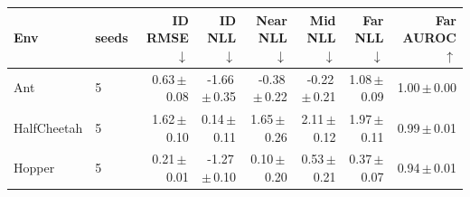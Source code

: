 \begin{tabular}{llrrrrrr}
\toprule
Env & seeds & ID RMSE $\downarrow$ & ID NLL $\downarrow$ & Near NLL $\downarrow$ & Mid NLL $\downarrow$ & Far NLL $\downarrow$ & Far AUROC $\uparrow$ \\
\midrule
Ant & 5 & 0.63\,$\pm$\,0.08 & -1.66\,$\pm$\,0.35 & -0.38\,$\pm$\,0.22 & -0.22\,$\pm$\,0.21 & 1.08\,$\pm$\,0.09 & 1.00\,$\pm$\,0.00 \\
HalfCheetah & 5 & 1.62\,$\pm$\,0.10 & 0.14\,$\pm$\,0.11 & 1.65\,$\pm$\,0.26 & 2.11\,$\pm$\,0.12 & 1.97\,$\pm$\,0.11 & 0.99\,$\pm$\,0.01 \\
Hopper & 5 & 0.21\,$\pm$\,0.01 & -1.27\,$\pm$\,0.10 & 0.10\,$\pm$\,0.20 & 0.53\,$\pm$\,0.21 & 0.37\,$\pm$\,0.07 & 0.94\,$\pm$\,0.01 \\
\bottomrule
\end{tabular}
